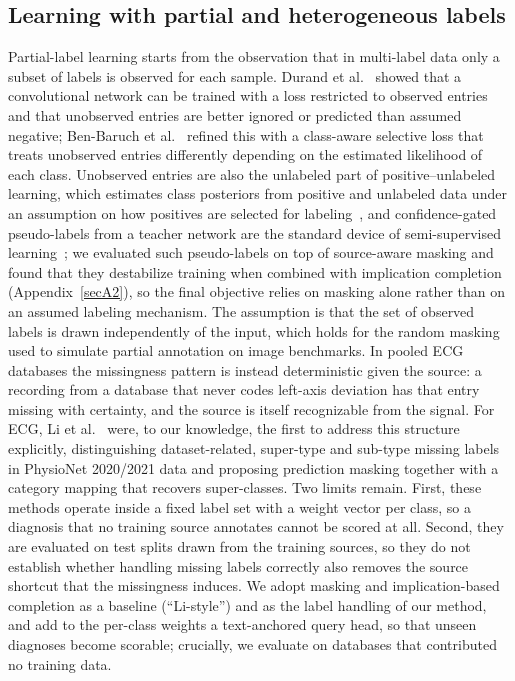 \subsection{Learning with partial and heterogeneous labels}\label{sec:rel_partial}
Partial-label learning starts from the observation that in multi-label data only a subset of labels is observed for each sample. Durand et al.~\cite{durand2019} showed that a convolutional network can be trained with a loss restricted to observed entries and that unobserved entries are better ignored or predicted than assumed negative; Ben-Baruch et al.~\cite{benbaruch2022} refined this with a class-aware selective loss that treats unobserved entries differently depending on the estimated likelihood of each class. Unobserved entries are also the unlabeled part of positive--unlabeled learning, which estimates class posteriors from positive and unlabeled data under an assumption on how positives are selected for labeling~\cite{elkan2008,kiryo2017}, and confidence-gated pseudo-labels from a teacher network are the standard device of semi-supervised learning~\cite{tarvainen2017,sohn2020fixmatch}; we evaluated such pseudo-labels on top of source-aware masking and found that they destabilize training when combined with implication completion (Appendix~\ref{secA2}), so the final objective relies on masking alone rather than on an assumed labeling mechanism. The assumption is that the set of observed labels is drawn independently of the input, which holds for the random masking used to simulate partial annotation on image benchmarks. In pooled ECG databases the missingness pattern is instead deterministic given the source: a recording from a database that never codes left-axis deviation has that entry missing with certainty, and the source is itself recognizable from the signal. For ECG, Li et al.~\cite{li2024} were, to our knowledge, the first to address this structure explicitly, distinguishing dataset-related, super-type and sub-type missing labels in PhysioNet 2020/2021 data and proposing prediction masking together with a category mapping that recovers super-classes. Two limits remain. First, these methods operate inside a fixed label set with a weight vector per class, so a diagnosis that no training source annotates cannot be scored at all. Second, they are evaluated on test splits drawn from the training sources, so they do not establish whether handling missing labels correctly also removes the source shortcut that the missingness induces. We adopt masking and implication-based completion as a baseline (``Li-style'') and as the label handling of our method, and add to the per-class weights a text-anchored query head, so that unseen diagnoses become scorable; crucially, we evaluate on databases that contributed no training data.

